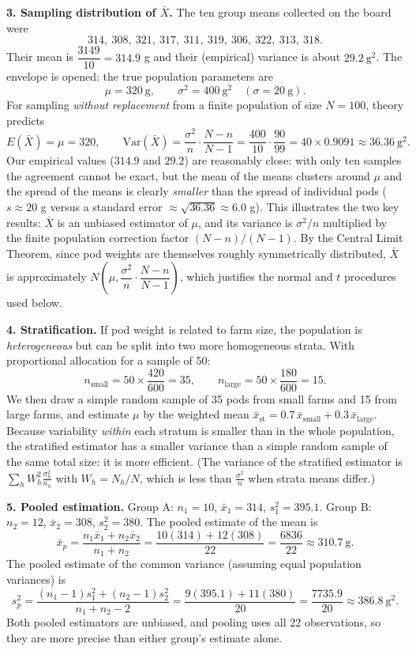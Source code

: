 \documentclass[11pt]{article}
\newcommand{\cle}[1]{{\popxbold\color{popdark}#1}}
\begin{document}
\textbf{3. Sampling distribution of $\bar{X}$.} The ten group means collected on the board were
\[ 314,\ 308,\ 321,\ 317,\ 311,\ 319,\ 306,\ 322,\ 313,\ 318. \]
Their mean is $\dfrac{3149}{10} = 314.9$ g and their (empirical) variance is about $29.2\ \mathrm{g}^2$. The envelope is opened: the true population parameters are
\[ \mu = 320\ \text{g}, \qquad \sigma^2 = 400\ \mathrm{g}^2 \quad (\sigma = 20\ \text{g}). \]
For sampling \emph{without replacement} from a finite population of size $N=100$, theory predicts
\[ E(\bar{X}) = \mu = 320, \qquad \mathrm{Var}(\bar{X}) = \frac{\sigma^2}{n}\cdot\frac{N-n}{N-1} = \frac{400}{10}\cdot\frac{90}{99} = 40 \times 0.9091 \approx 36.36\ \mathrm{g}^2. \]
Our empirical values ($314.9$ and $29.2$) are reasonably close: with only ten samples the agreement cannot be exact, but the mean of the means clusters around $\mu$ and the spread of the means is clearly \emph{smaller} than the spread of individual pods ($s \approx 20$ g versus a standard error $\approx \sqrt{36.36} \approx 6.0$ g). This illustrates the two key results: $\bar{X}$ is an unbiased estimator of $\mu$, and its variance is $\sigma^2/n$ multiplied by the finite population correction factor $(N-n)/(N-1)$. By the \cle{Central Limit Theorem}, since pod weights are themselves roughly symmetrically distributed, $\bar{X}$ is approximately $N\!\left(\mu, \dfrac{\sigma^2}{n}\cdot\dfrac{N-n}{N-1}\right)$, which justifies the normal and $t$ procedures used below.

\textbf{4. Stratification.} If pod weight is related to farm size, the population is \emph{heterogeneous} but can be split into two more homogeneous \cle{strata}. With proportional allocation for a sample of 50:
\[ n_{\text{small}} = 50 \times \frac{420}{600} = 35, \qquad n_{\text{large}} = 50 \times \frac{180}{600} = 15. \]
We then draw a simple random sample of 35 pods from small farms and 15 from large farms, and estimate $\mu$ by the weighted mean $\bar{x}_{\text{st}} = 0.7\,\bar{x}_{\text{small}} + 0.3\,\bar{x}_{\text{large}}$. Because variability \emph{within} each stratum is smaller than in the whole population, the stratified estimator has a smaller variance than a simple random sample of the same total size: it is more \cle{efficient}. (The variance of the stratified estimator is $\sum_{h} W_h^2 \frac{\sigma_h^2}{n_h}$ with $W_h = N_h/N$, which is less than $\frac{\sigma^2}{n}$ when strata means differ.)

\textbf{5. Pooled estimation.} Group A: $n_1 = 10$, $\bar{x}_1 = 314$, $s_1^2 = 395.1$. Group B: $n_2 = 12$, $\bar{x}_2 = 308$, $s_2^2 = 380$. The pooled estimate of the mean is
\[ \bar{x}_p = \frac{n_1 \bar{x}_1 + n_2 \bar{x}_2}{n_1 + n_2} = \frac{10(314) + 12(308)}{22} = \frac{6836}{22} \approx 310.7\ \text{g}. \]
The pooled estimate of the common variance (assuming equal population variances) is
\[ s_p^2 = \frac{(n_1 - 1)s_1^2 + (n_2 - 1)s_2^2}{n_1 + n_2 - 2} = \frac{9(395.1) + 11(380)}{20} = \frac{7735.9}{20} \approx 386.8\ \mathrm{g}^2. \]
Both pooled estimators are unbiased, and pooling uses all 22 observations, so they are more precise than either group's estimate alone.
\end{document}

